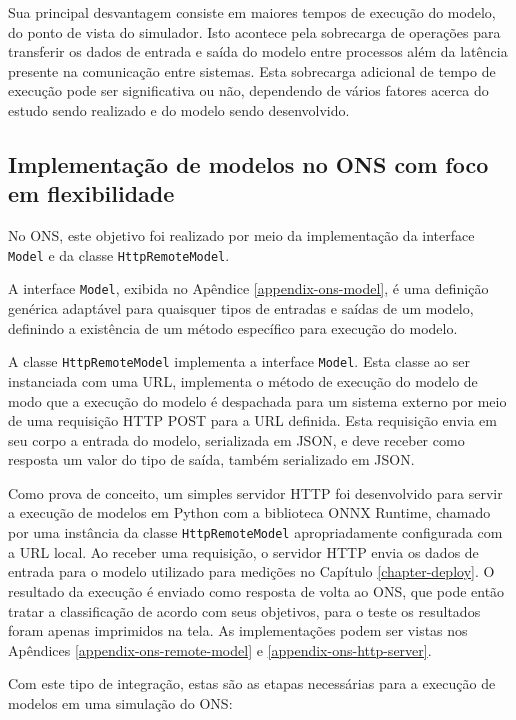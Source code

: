 Sua principal desvantagem consiste em maiores tempos de execução do modelo, do ponto de vista do simulador. Isto acontece pela sobrecarga de operações para transferir os dados de entrada e saída do modelo entre processos além da latência presente na comunicação entre sistemas. Esta sobrecarga adicional de tempo de execução pode ser significativa ou não, dependendo de vários fatores acerca do estudo sendo realizado e do modelo sendo desenvolvido.

\subsection{Implementação de modelos no ONS com foco em flexibilidade}

No ONS, este objetivo foi realizado por meio da implementação da interface \texttt{Model} e da classe \texttt{HttpRemoteModel}.

A interface \texttt{Model}, exibida no Apêndice \ref{appendix-ons-model}, é uma definição genérica adaptável para quaisquer tipos de entradas e saídas de um modelo, definindo a existência de um método específico para execução do modelo.

A classe \texttt{HttpRemoteModel} implementa a interface \texttt{Model}. Esta classe ao ser instanciada com uma URL, implementa o método de execução do modelo de modo que a execução do modelo é despachada para um sistema externo por meio de uma requisição HTTP POST para a URL definida. Esta requisição envia em seu corpo a entrada do modelo, serializada em JSON, e deve receber como resposta um valor do tipo de saída, também serializado em JSON.

Como prova de conceito, um simples servidor HTTP foi desenvolvido para servir a execução de modelos em Python com a biblioteca ONNX Runtime, chamado por uma instância da classe \texttt{HttpRemoteModel} apropriadamente configurada com a URL local. Ao receber uma requisição, o servidor HTTP envia os dados de entrada para o modelo utilizado para medições no Capítulo \ref{chapter-deploy}. O resultado da execução é enviado como resposta de volta ao ONS, que pode então tratar a classificação de acordo com seus objetivos, para o teste os resultados foram apenas imprimidos na tela. As implementações podem ser vistas nos Apêndices \ref{appendix-ons-remote-model} e \ref{appendix-ons-http-server}.

Com este tipo de integração, estas são as etapas necessárias para a execução de modelos em uma simulação do ONS:

